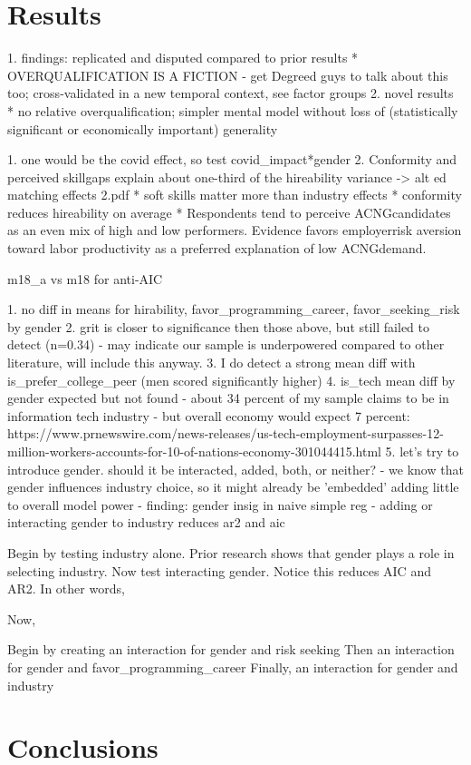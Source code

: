 \documentclass[review]{elsarticle}
\begin{document}
\section{Results}

1. findings: replicated and disputed compared to prior results
    * OVERQUALIFICATION IS A FICTION - get Degreed guys to talk about this too; cross-validated in a new temporal context, see factor groups
2. novel results
    * no relative overqualification; simpler mental model without loss of (statistically significant or economically important) generality

1. one would be the covid effect, so test covid_impact*gender
2.  Conformity  and  perceived  skillgaps  explain  about  one-third  of  the  hireability  variance -> alt ed matching effects 2.pdf
    * soft skills matter more than industry effects
    * conformity reduces hireability on average
    * Respondents tend to perceive ACNGcandidates as an even mix of high and low performers.  Evidence favors employerrisk aversion toward labor productivity as a preferred explanation of low ACNGdemand.

m18_a vs m18 for anti-AIC


1. no diff in means for hirability, favor_programming_career, favor_seeking_risk by gender
2. grit is closer to significance then those above, but still failed to detect (n=0.34)
    - may indicate our sample is underpowered compared to other literature, will include this anyway.
3. I do detect a strong mean diff with is_prefer_college_peer (men scored significantly higher)
4. is_tech mean diff by gender expected but not found
    - about 34 percent of my sample claims to be in information tech industry
    - but overall economy would expect 7 percent: https://www.prnewswire.com/news-releases/us-tech-employment-surpasses-12-million-workers-accounts-for-10-of-nations-economy-301044415.html
5. let's try to introduce gender. should it be interacted, added, both, or neither?
    - we know that gender influences industry choice, so it might already be 'embedded' adding little to overall model power
    - finding: gender insig in naive simple reg
    - adding or interacting gender to industry reduces ar2 and aic






Begin by testing industry alone. Prior research shows that gender plays a role in selecting industry.
Now test interacting gender. Notice this reduces AIC and AR2. In other words,

Now,

Begin by creating an interaction for gender and risk seeking
Then an interaction for gender and favor_programming_career
Finally, an interaction for gender and industry


\section{Conclusions}





\end{document}
